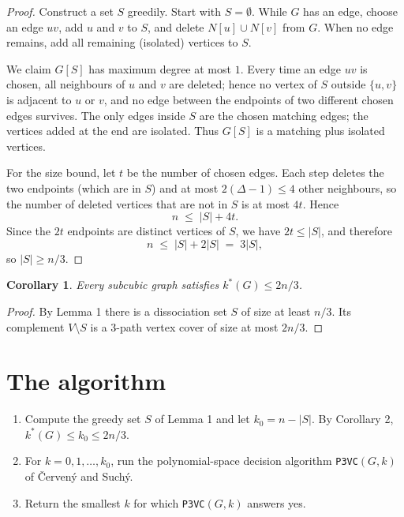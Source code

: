 \documentclass[11pt]{article}
\newtheorem{corollary}{Corollary}
\begin{document}
\begin{proof}
Construct a set $S$ greedily. Start with $S = \emptyset$. While $G$ has an edge, choose
an edge $uv$, add $u$ and $v$ to $S$, and delete $N[u] \cup N[v]$ from $G$. When no
edge remains, add all remaining (isolated) vertices to $S$.

We claim $G[S]$ has maximum degree at most $1$. Every time an edge $uv$ is chosen, all
neighbours of $u$ and $v$ are deleted; hence no vertex of $S$ outside $\{u,v\}$ is
adjacent to $u$ or $v$, and no edge between the endpoints of two different chosen
edges survives. The only edges inside $S$ are the chosen matching edges; the vertices
added at the end are isolated. Thus $G[S]$ is a matching plus isolated vertices.

For the size bound, let $t$ be the number of chosen edges. Each step deletes the two
endpoints (which are in $S$) and at most $2(\Delta-1) \le 4$ other neighbours, so the
number of deleted vertices that are not in $S$ is at most $4t$. Hence
\[
  n \;\le\; |S| + 4t .
\]
Since the $2t$ endpoints are distinct vertices of $S$, we have $2t \le |S|$, and
therefore
\[
  n \;\le\; |S| + 2|S| \;=\; 3|S| ,
\]
so $|S| \ge n/3$.
\end{proof}

\begin{corollary}
Every subcubic graph satisfies $k^*(G) \le 2n/3$.
\end{corollary}

\begin{proof}
By Lemma 1 there is a dissociation set $S$ of size at least $n/3$. Its complement
$V \setminus S$ is a 3-path vertex cover of size at most $2n/3$.
\end{proof}

\section{The algorithm}

\begin{enumerate}
\item Compute the greedy set $S$ of Lemma 1 and let $k_0 = n - |S|$. By Corollary 2,
      $k^*(G) \le k_0 \le 2n/3$.
\item For $k = 0,1,\dots,k_0$, run the polynomial-space decision algorithm
      \texttt{P3VC}$(G,k)$ of \v{C}erven\'y and Such\'y.
\item Return the smallest $k$ for which \texttt{P3VC}$(G,k)$ answers yes.
\end{enumerate}
\end{document}
